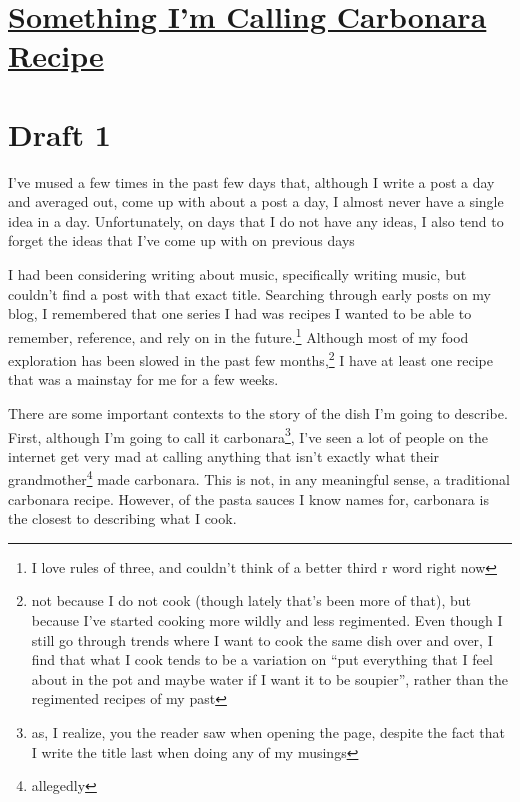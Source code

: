 \documentclass[12pt]{article}[titlepage]
\newcommand{\say}[1]{``#1''}
\newcommand{\1}{\={a}}
\newcommand{\2}{\={e}}
\newcommand{\3}{\={\i}}
\newcommand{\4}{\=o}
\newcommand{\5}{\=u}
\newcommand{\6}{\={A}}
\renewcommand{\,}{\textsuperscript{,}}
\begin{document}
\doublespacing
\section{\href{carbonara-recipe.html}{Something I'm Calling Carbonara Recipe}}

\section{Draft 1}
I've mused a few times in the past few days that, although I write a post a day and averaged out, come up with about a post a day, I almost never have a single idea in a day.
Unfortunately, on days that I do not have any ideas, I also tend to forget the ideas that I've come up with on previous days

I had been considering writing about music, specifically writing music, but couldn't find a post with that exact title.
Searching through early posts on my blog, I remembered that one series I had was recipes I wanted to be able to remember, reference, and rely on in the future.\footnote{I love rules of three, and couldn't think of a better third r word right now}
Although most of my food exploration has been slowed in the past few months,\footnote{not because I do not cook (though lately that's been more of that), but because I've started cooking more wildly and less regimented.
Even though I still go through trends where I want to cook the same dish over and over, I find that what I cook tends to be a variation on \say{put everything that I feel about in the pot and maybe water if I want it to be soupier}, rather than the regimented recipes of my past}
I have at least one recipe that was a mainstay for me for a few weeks.

There are some important contexts to the story of the dish I'm going to describe.
First, although I'm going to call it carbonara\footnote{as, I realize, you the reader saw when opening the page, despite the fact that I write the title last when doing any of my musings}, I've seen a lot of people on the internet get very mad at calling anything that isn't exactly what their grandmother\footnote{allegedly} made carbonara.
This is not, in any meaningful sense, a traditional carbonara recipe.
However, of the pasta sauces I know names for, carbonara is the closest to describing what I cook.
\end{document}
